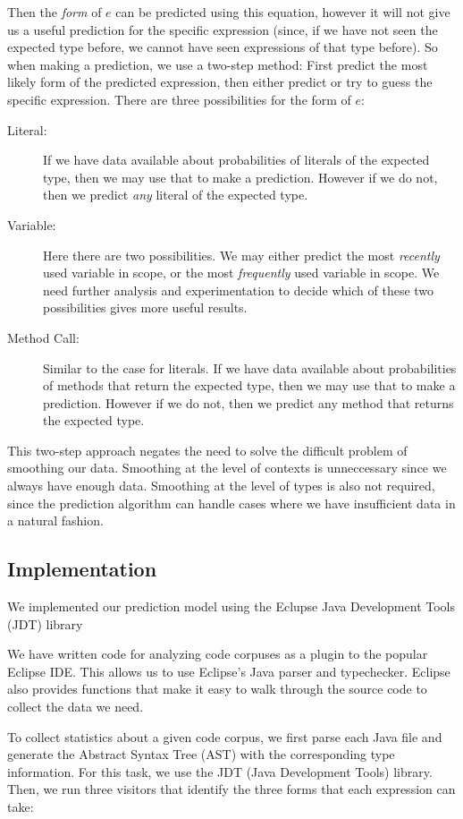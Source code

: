 \documentclass{article} %
\begin{document}
Then the \emph{form} of $e$ can be predicted using this equation, however it will not give us a useful prediction for the specific expression (since, if we have not seen the expected type before, we cannot have seen expressions of that type before). So when making a prediction, we use a two-step method: First predict the most likely form of the predicted expression, then either predict or try to guess the specific expression. There are three possibilities for the form of $e$:
\begin{description}
  \item[Literal:] If we have data available about probabilities of literals of the expected type, then we may use that to make a prediction. However if we do not, then we predict \emph{any} literal of the expected type.
  \item[Variable:] Here there are two possibilities. We may either predict the most \emph{recently} used variable in scope, or the most \emph{frequently} used variable in scope. We need further analysis and experimentation to decide which of these two possibilities gives more useful results.
  \item[Method Call:] Similar to the case for literals. If we have data available about probabilities of methods that return the expected type, then we may use that to make a prediction. However if we do not, then we predict any method that returns the expected type.
\end{description}

This two-step approach negates the need to solve the difficult problem of smoothing our data. Smoothing at the level of contexts is unneccessary since we always have enough data. Smoothing at the level of types is also not required, since the prediction algorithm can handle cases where we have insufficient data in a natural fashion.

\subsection*{Implementation}

We implemented our prediction model using the Eclupse Java Development Tools (JDT) library

We have written code for analyzing code corpuses as a plugin to the popular Eclipse IDE. This allows us to use Eclipse's Java parser and typechecker. Eclipse also provides functions that make it easy to walk through the source code to collect the data we need.

To collect statistics about a given code corpus, we first parse each Java file and generate the Abstract Syntax Tree (AST) with the corresponding type information. For this task, we use the JDT (Java Development Tools) library. Then, we run three visitors that identify the three forms that each expression can take:
\end{document}
